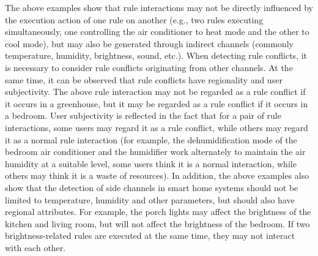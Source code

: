 The above examples show that rule interactions may not be directly influenced by the execution action of one rule on another (e.g., two rules executing simultaneously, one controlling the air conditioner to heat mode and the other to cool mode), but may also be generated through indirect channels (commonly temperature, humidity, brightness, sound, etc.). When detecting rule conflicts, it is necessary to consider rule conflicts originating from other channels. At the same time, it can be observed that rule conflicts have regionality and user subjectivity. The above rule interaction may not be regarded as a rule conflict if it occurs in a greenhouse, but it may be regarded as a rule conflict if it occurs in a bedroom. User subjectivity is reflected in the fact that for a pair of rule interactions, some users may regard it as a rule conflict, while others may regard it as a normal rule interaction (for example, the dehumidification mode of the bedroom air conditioner and the humidifier work alternately to maintain the air humidity at a suitable level, some users think it is a normal interaction, while others may think it is a waste of resources). In addition, the above examples also show that the detection of side channels in smart home systems should not be limited to temperature, humidity and other parameters, but should also have regional attributes. For example, the porch lights may affect the brightness of the kitchen and living room, but will not affect the brightness of the bedroom. If two brightness-related rules are executed at the same time, they may not interact with each other.

